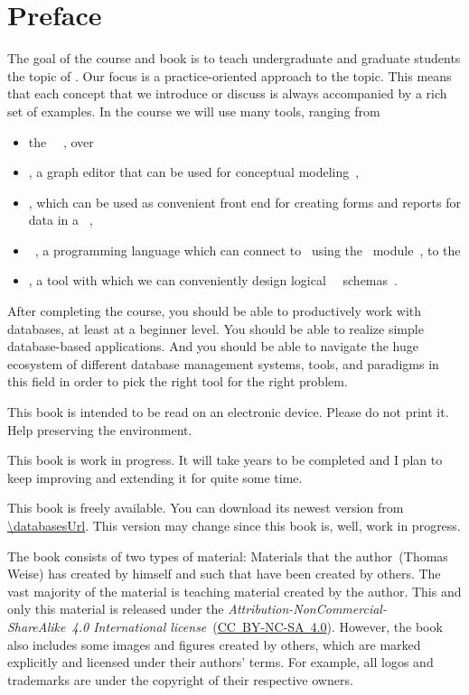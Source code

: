 \chapter*{Preface}%
%
%
The goal of the course and book is to teach undergraduate and graduate students the topic of .
Our focus is a practice-oriented approach to the topic.
This means that each concept that we introduce or discuss is always accompanied by a rich set of examples.
In the course we will use many tools, ranging from%
%
\begin{itemize}%
\item the \postgresql\ ~\cite{TA2024DDAMWPAM,FP2023LP,OH2017PUAR,B2024PELUYDW}, over%
\item \yEd, a graph editor that can be used for conceptual modeling~\cite{SG2015MDAWY,Y2011YGEM},%
\item \libreofficeBase, which can be used as convenient front end for creating forms and reports for data in a ~\cite{FNFHWSKLSSGLFRSRPLJG2022BG7R1BOL7C,S2022L7PFEUU},%
\item \python~\cite{programmingWithPython}, a programming language which can connect to \postgresql\ using the \psycopg\ module~\cite{VDGE2010P}, to the%
\item \pgmodeler, a tool with which we can conveniently design logical \postgresql\ \db\ schemas~\cite{AES2006PPDM}.%
\end{itemize}%
%
After completing the course, you should be able to productively work with databases, at least at a beginner level.
You should be able to realize simple database-based applications.
And you should be able to navigate the huge ecosystem of different database management systems, tools, and paradigms in this field in order to pick the right tool for the right problem.

This book is intended to be read on an electronic device.
Please do not print it.
Help preserving the environment.

This book is work in progress.
It will take years to be completed and I plan to keep improving and extending it for quite some time.

This book is freely available.
You can download its newest version from \expandafter\url{\databasesUrl}.
This version may change since this book is, well, work in progress.

The book consists of two types of material:
Materials that the author~(Thomas Weise) has created by himself and such that have been created by others.
The vast majority of the material is teaching material created by the author.
This and only this material is released under the \emph{Attribution-NonCommercial-ShareAlike~4.0 International license}~(\href{http://creativecommons.org/licenses/by-nc-sa/4.0/}{\mbox{CC~BY-NC-SA~4.0}}).
However, the book also includes some images and figures created by others, which are marked explicitly and licensed under their authors' terms.
For example, all logos and trademarks are under the copyright of their respective owners.

